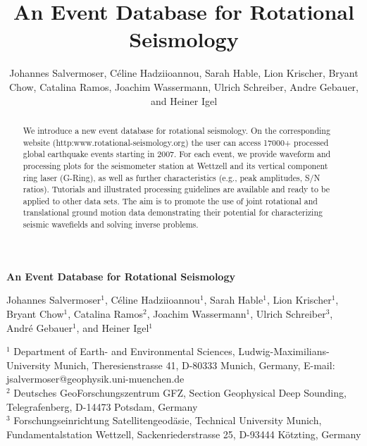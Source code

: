 \documentclass[12pt,reqno,letter]{article}
\begin{document}
% 
\title{An Event Database for Rotational Seismology}

\author{Johannes Salvermoser, C\'{e}line Hadziioannou, Sarah Hable, Lion Krischer, Bryant Chow, Catalina Ramos, Joachim Wassermann, Ulrich Schreiber, Andre Gebauer, and Heiner Igel}

\noindent
\textbf{An Event Database for Rotational Seismology}

\vspace{2em}
\noindent
Johannes Salvermoser$^{1}$, C\'{e}line Hadziioannou$^{1}$, Sarah Hable$^{1}$, Lion Krischer$^{1}$, Bryant Chow$^{1}$, Catalina Ramos$^{2}$, Joachim Wassermann$^{1}$, Ulrich Schreiber$^{3}$, Andr\'{e} Gebauer$^{1}$, and Heiner Igel$^{1}$
\vspace{1em}

\noindent
$^{1}$ Department of Earth- and Environmental Sciences, Ludwig-Maximilians-University Munich, Theresienstrasse 41, D-80333 Munich, Germany, E-mail: jsalvermoser@geophysik.uni-muenchen.de\\
$^{2}$ Deutsches GeoForschungszentrum GFZ, Section Geophysical Deep Sounding, Telegrafenberg, D-14473 Potsdam, Germany\\
$^{3}$ Forschungseinrichtung Satellitengeod{\"a}sie, Technical University Munich, Fundamentalstation Wettzell, Sackenriederstrasse 25, D-93444 K{\"o}tzting, Germany

\begin{abstract}
We introduce a new event database for rotational seismology. On the corresponding website (http:www.rotational-seismology.org) the user can access 17000+ processed global earthquake events starting in 2007. For each event, we provide waveform and processing plots for the seismometer station at Wettzell and its vertical component ring laser (G-Ring), as well as further characteristics (e.g., peak amplitudes, S/N ratios). Tutorials and illustrated processing guidelines are available and ready to be applied to other data sets. The aim is to promote the use of joint rotational and translational ground motion data demonstrating their potential for characterizing seismic wavefields and solving inverse problems. 
\end{abstract}
% 
% 
\end{document}
